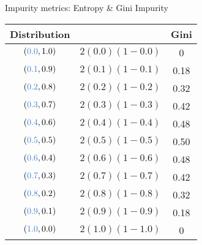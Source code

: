 \begin{frame}{\vskip -0.2cm \Large Impurity metrics: Entropy \& Gini Impurity}
\begin{multicols}{2}
	\pause
	\begin{minipage}{4.5cm}
	\begin{flushright}
	{\normalsize
	\begin{tabular}{|c|c|c|}
	\hline
	{\small Distribution} && {\small Gini} \\
	\hline \hline
	$({\color{gcblue}0.0}, 1.0)$ & \textnormal{\tiny$2(0.0)(1-0.0)$} & 0 \\
	$({\color{gcblue}0.1}, 0.9)$ & \textnormal{\tiny$2(0.1)(1-0.1)$} & 0.18 \\
	$({\color{gcblue}0.2}, 0.8)$ & \textnormal{\tiny$2(0.2)(1-0.2)$} & 0.32 \\
	$({\color{gcblue}0.3}, 0.7)$ & \textnormal{\tiny$2(0.3)(1-0.3)$} & 0.42 \\
	$({\color{gcblue}0.4}, 0.6)$ & \textnormal{\tiny$2(0.4)(1-0.4)$} & 0.48 \\
	$({\color{gcblue}0.5}, 0.5)$ & \textnormal{\tiny$2(0.5)(1-0.5)$} & 0.50 \\
	$({\color{gcblue}0.6}, 0.4)$ & \textnormal{\tiny$2(0.6)(1-0.6)$} & 0.48 \\
	$({\color{gcblue}0.7}, 0.3)$ & \textnormal{\tiny$2(0.7)(1-0.7)$} & 0.42 \\
	$({\color{gcblue}0.8}, 0.2)$ & \textnormal{\tiny$2(0.8)(1-0.8)$} & 0.32 \\
	$({\color{gcblue}0.9}, 0.1)$ & \textnormal{\tiny$2(0.9)(1-0.9)$} & 0.18 \\
	$({\color{gcblue}1.0}, 0.0)$ & \textnormal{\tiny$2(1.0)(1-1.0)$} & 0      \\
	\hline
	\end{tabular}
	}
	\end{flushright}
	\end{minipage}
	
\end{multicols}

\end{frame}
\normalsize


